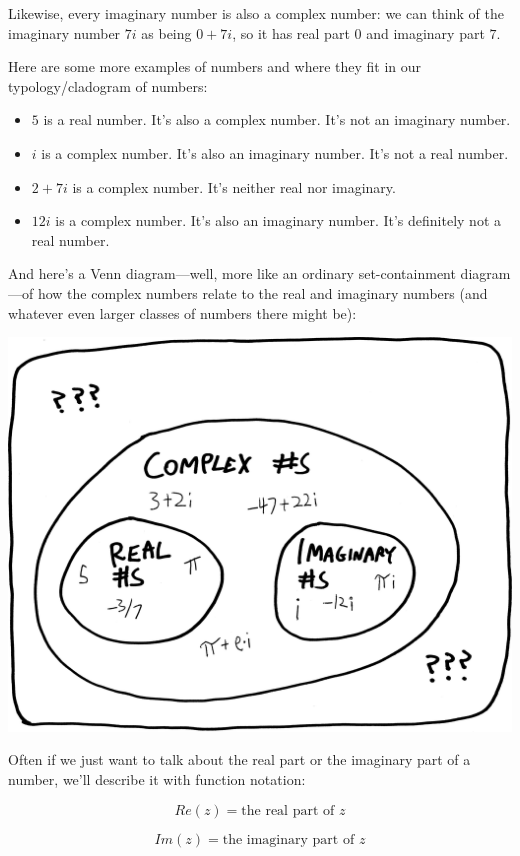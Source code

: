 \documentclass[
]{article}
\providecommand{\tightlist}{%
  \setlength{\itemsep}{0pt}\setlength{\parskip}{0pt}}
\begin{document}
Likewise, every imaginary number is also a complex number: we can think
of the imaginary number \(7i\) as being \(0+7i\), so it has real part
\(0\) and imaginary part \(7\).

Here are some more examples of numbers and where they fit in our
typology/cladogram of numbers:

\begin{itemize}
\tightlist
\item
  \(5\) is a real number. It's also a complex number. It's not an
  imaginary number.
\item
  \(i\) is a complex number. It's also an imaginary number. It's not a
  real number.
\item
  \(2+7i\) is a complex number. It's neither real nor imaginary.
\item
  \(12i\) is a complex number. It's also an imaginary number. It's
  definitely not a real number.
\end{itemize}

And here's a Venn diagram---well, more like an ordinary set-containment
diagram---of how the complex numbers relate to the real and imaginary
numbers (and whatever even larger classes of numbers there might be):

\includegraphics{./complex-numbers-set-diagram.png}

Often if we just want to talk about the real part or the imaginary part
of a number, we'll describe it with function notation:

\[Re(z) = \text{the real part of } z\]

\[Im(z) = \text{the imaginary part of } z\]
\end{document}
